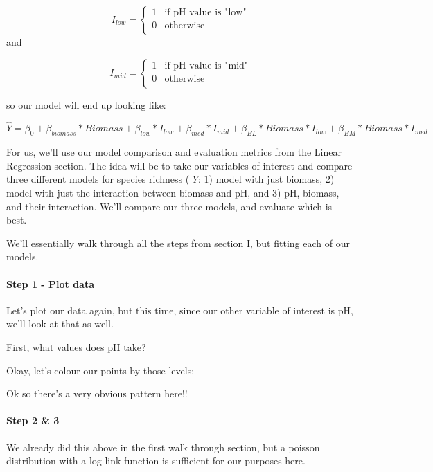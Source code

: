 \documentclass[
]{article}
\begin{document}
\[I_{low} = 
\begin{cases}
1 & \text{if pH value is "low"}\\
0 & \text{otherwise}\\
\end{cases}
\] and

\[I_{mid} = 
\begin{cases}
1 & \text{if pH value is "mid"}\\
0 & \text{otherwise}\\
\end{cases}
\]

so our model will end up looking like:

\[\hat{Y} = \beta_0 + \beta_{biomass}*Biomass + \beta_{low}*I_{low} + \beta_{med}*I_{mid} + \beta_{BL}*Biomass*I_{low} + \beta_{BM}*Biomass*I_{med}\]

For us, we'll use our model comparison and evaluation metrics from the
Linear Regression section. The idea will be to take our variables of
interest and compare three different models for species richness (
\(Y\): 1) model with just biomass, 2) model with just the interaction
between biomass and pH, and 3) pH, biomass, and their interaction. We'll
compare our three models, and evaluate which is best.

We'll essentially walk through all the steps from section I, but fitting
each of our models.

\hypertarget{step-1---plot-data-1}{%
\paragraph{Step 1 - Plot data}\label{step-1---plot-data-1}}

Let's plot our data again, but this time, since our other variable of
interest is pH, we'll look at that as well.

First, what values does pH take?

Okay, let's colour our points by those levels:

Ok so there's a very obvious pattern here!!

\hypertarget{step-2-3}{%
\paragraph{Step 2 \& 3}\label{step-2-3}}

We already did this above in the first walk through section, but a
poisson distribution with a log link function is sufficient for our
purposes here.
\end{document}
